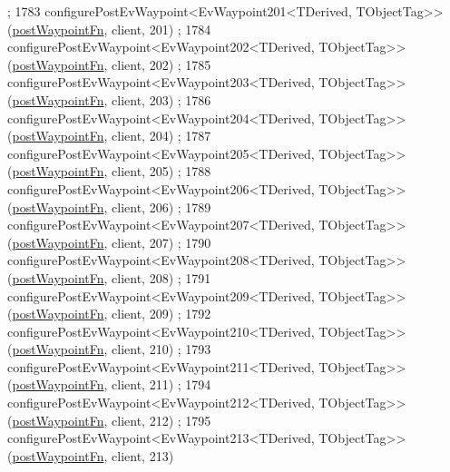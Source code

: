 \begin{DoxyCode}
      ;
1783     configurePostEvWaypoint<EvWaypoint201<TDerived, TObjectTag>>(\hyperlink{classcl__move__base__z_1_1WaypointEventDispatcher_a964a57fcce5d48ec60243230722d8dd7}{postWaypointFn}, client, 201)
      ;
1784     configurePostEvWaypoint<EvWaypoint202<TDerived, TObjectTag>>(\hyperlink{classcl__move__base__z_1_1WaypointEventDispatcher_a964a57fcce5d48ec60243230722d8dd7}{postWaypointFn}, client, 202)
      ;
1785     configurePostEvWaypoint<EvWaypoint203<TDerived, TObjectTag>>(\hyperlink{classcl__move__base__z_1_1WaypointEventDispatcher_a964a57fcce5d48ec60243230722d8dd7}{postWaypointFn}, client, 203)
      ;
1786     configurePostEvWaypoint<EvWaypoint204<TDerived, TObjectTag>>(\hyperlink{classcl__move__base__z_1_1WaypointEventDispatcher_a964a57fcce5d48ec60243230722d8dd7}{postWaypointFn}, client, 204)
      ;
1787     configurePostEvWaypoint<EvWaypoint205<TDerived, TObjectTag>>(\hyperlink{classcl__move__base__z_1_1WaypointEventDispatcher_a964a57fcce5d48ec60243230722d8dd7}{postWaypointFn}, client, 205)
      ;
1788     configurePostEvWaypoint<EvWaypoint206<TDerived, TObjectTag>>(\hyperlink{classcl__move__base__z_1_1WaypointEventDispatcher_a964a57fcce5d48ec60243230722d8dd7}{postWaypointFn}, client, 206)
      ;
1789     configurePostEvWaypoint<EvWaypoint207<TDerived, TObjectTag>>(\hyperlink{classcl__move__base__z_1_1WaypointEventDispatcher_a964a57fcce5d48ec60243230722d8dd7}{postWaypointFn}, client, 207)
      ;
1790     configurePostEvWaypoint<EvWaypoint208<TDerived, TObjectTag>>(\hyperlink{classcl__move__base__z_1_1WaypointEventDispatcher_a964a57fcce5d48ec60243230722d8dd7}{postWaypointFn}, client, 208)
      ;
1791     configurePostEvWaypoint<EvWaypoint209<TDerived, TObjectTag>>(\hyperlink{classcl__move__base__z_1_1WaypointEventDispatcher_a964a57fcce5d48ec60243230722d8dd7}{postWaypointFn}, client, 209)
      ;
1792     configurePostEvWaypoint<EvWaypoint210<TDerived, TObjectTag>>(\hyperlink{classcl__move__base__z_1_1WaypointEventDispatcher_a964a57fcce5d48ec60243230722d8dd7}{postWaypointFn}, client, 210)
      ;
1793     configurePostEvWaypoint<EvWaypoint211<TDerived, TObjectTag>>(\hyperlink{classcl__move__base__z_1_1WaypointEventDispatcher_a964a57fcce5d48ec60243230722d8dd7}{postWaypointFn}, client, 211)
      ;
1794     configurePostEvWaypoint<EvWaypoint212<TDerived, TObjectTag>>(\hyperlink{classcl__move__base__z_1_1WaypointEventDispatcher_a964a57fcce5d48ec60243230722d8dd7}{postWaypointFn}, client, 212)
      ;
1795     configurePostEvWaypoint<EvWaypoint213<TDerived, TObjectTag>>(\hyperlink{classcl__move__base__z_1_1WaypointEventDispatcher_a964a57fcce5d48ec60243230722d8dd7}{postWaypointFn}, client, 213)

\end{DoxyCode}
